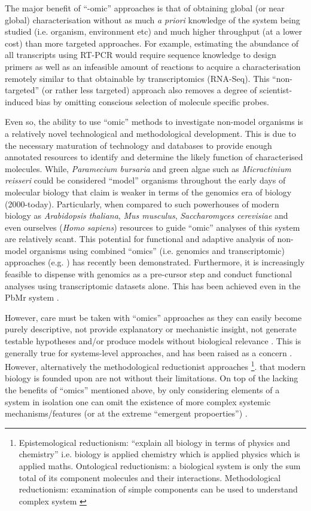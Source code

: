 The major benefit of ``-omic'' approaches is that of obtaining global (or near global) characterisation
without as much \textit{a priori} knowledge of the system being studied (i.e. organism,
environment etc) and much higher throughput (at a lower cost) than more targeted
approaches. For example, estimating the abundance of all transcripts using RT-PCR
would require sequence knowledge to design primers as well as an infeasible amount of
reactions to acquire a characterisation remotely similar to that obtainable by transcriptomics (RNA-Seq).
This ``non-targeted'' (or rather less targeted) approach also removes a degree of scientist-induced bias 
by omitting conscious selection of molecule specific probes.

Even so, the ability to use ``omic'' methods to investigate non-model
organisms is a relatively novel technological and methodological development.
This is due to the necessary maturation of technology and databases to provide
enough annotated resources to identify and determine the likely function of characterised
molecules. While, \textit{Paramecium bursaria} and green algae such as \textit{Micractinium
reisseri} could be considered ``model'' organisms throughout the early days of 
molecular biology that claim is weaker in terms of the genomics era
of biology (2000-today).  Particularly, when compared to such powerhouses of modern 
biology as \textit{Arabidopsis thaliana}, \textit{Mus musculus}, \textit{Saccharomyces
cerevisiae} and even ourselves (\textit{Homo sapiens}) resources to guide ``omic''
analyses of this system are relatively scant.
This potential for functional and adaptive analysis of non-model organisms using 
combined ``omics'' (i.e. genomics and transcriptomic) approaches (e.g. \citep{Munoz-Merida2013,Feldmesser2014})
has recently been demonstrated. Furthermore, it is increasingly feasible to dispense
with genomics as a pre-cursor step and conduct functional analyses using transcriptomic datasets alone.
This has been achieved even in the PbMr system \citep{Kodama2014}.

However, care must be taken with ``omics'' approaches as they can easily become purely descriptive,
not provide explanatory or mechanistic insight, not generate testable hypotheses and/or produce
models without biological relevance \citep{Fang2011}. This is generally true
for systems-level approaches, and has been raised as a concern \citep{Dougherty2008}.  
However, alternatively the methodological reductionist approaches
\footnote{
    Epistemological reductionism: ``explain all biology in terms of physics and chemistry'' \citep{Crick1966}
    i.e. biology is applied chemistry which is applied physics which is applied maths. 
    Ontological reductionism: a biological system is only the sum total of its component molecules and their
    interactions.
    Methodological reductionism: examination of simple components can be used to understand complex system \citep{Fang2011}}.
that modern biology is founded upon are not without their limitations.
On top of the lacking the benefits of ``omics'' mentioned above, by only considering elements of a system in isolation
one can omit the existence of more complex systemic mechanisms/features (or at the extreme ``emergent propoerties'') \citep{Fang2011}.  

